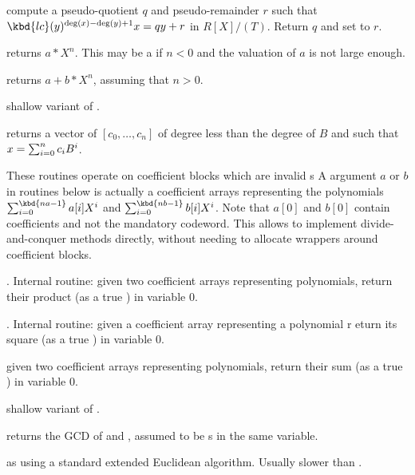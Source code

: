  compute
a pseudo-quotient $q$ and pseudo-remainder $r$ such that
$\kbd{lc}(y)^{\deg(x) - \deg(y) + 1}x = qy + r$ in $R[X]/(T)$. Return $q$ and
set  to $r$.

 returns $a * X^n$. This may
be a  if $n < 0$ and the valuation of $a$ is not large
enough.

 returns $a + b * X^n$, assuming
that $n > 0$.

 shallow
variant of .

 returns a vector of 
$[c_0,\ldots,c_n]$ of degree less than the degree of $B$ and such that
$x=\sum_{i=0}^{n}{c_i\*B^i}$.


These routines operate on coefficient blocks which are invalid s
A  argument $a$ or $b$ in routines below is actually a coefficient
arrays representing the polynomials
 $\sum_{i = 0}^{\kbd{na-1}} a[i] X^i$ and
 $\sum_{i = 0}^{\kbd{nb-1}} b[i] X^i$. Note that $a[0]$ and $b[0]$ contain
coefficients and not the mandatory  codeword. This allows to implement
divide-and-conquer methods directly, without needing to allocate wrappers
around coefficient blocks.

. Internal routine:
given two coefficient arrays representing polynomials, return their product (as
a true ) in variable $0$.

. Internal routine:
given a coefficient array representing a polynomial r eturn its square (as a
true ) in variable $0$.

given two coefficient arrays representing polynomials, return their sum (as a
true ) in variable $0$.

 shallow
variant of .


 returns the GCD of  and ,
assumed to be s in the same variable.

 as  using a standard
extended Euclidean algorithm. Usually slower than .

